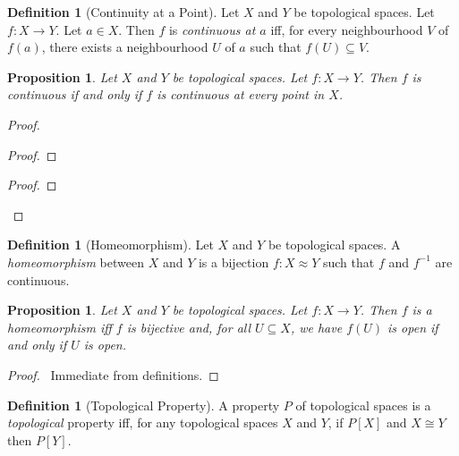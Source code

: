 \documentclass{book}
\let\qed\relax
\newtheorem{prop}[ax]{Proposition}
\theoremstyle{definition}
\newtheorem{df}[ax]{Definition}
\newcommand{\inv}[1]{\ensuremath{{#1}^{-1}}}
\begin{document}
\begin{df}[Continuity at a Point]
Let $X$ and $Y$ be topological spaces. Let $f : X \rightarrow Y$. Let $a \in X$. Then $f$ is \emph{continuous at $a$} iff, for every neighbourhood $V$ of $f(a)$, there exists a neighbourhood $U$ of $a$ such that $f(U) \subseteq V$.
\end{df}

\begin{prop}
Let $X$ and $Y$ be topological spaces. Let $f : X \rightarrow Y$. Then $f$ is continuous if and only if $f$ is continuous at every point in $X$.
\end{prop}

\begin{proof}
\begin{proof}
	\step{d}{\pflet{$U = \inv{f}(V)$}}
\end{proof}
\begin{proof}
	\step{c}{\pflet{$x \in \inv{f}(V)$}}
	\step{f}{$x \in U \subseteq \inv{f}(V)$}
\end{proof}
\qed
\end{proof}

\begin{df}[Homeomorphism]
Let $X$ and $Y$ be topological spaces. A \emph{homeomorphism} between $X$ and $Y$ is a bijection $f : X \approx Y$ such that $f$ and $\inv{f}$ are continuous.
\end{df}

\begin{prop}
Let $X$ and $Y$ be topological spaces. Let $f : X \rightarrow Y$. Then $f$ is a homeomorphism iff $f$ is bijective and, for all $U \subseteq X$, we have $f(U)$ is open if and only if $U$ is open.
\end{prop}

\begin{proof}
\pf\ Immediate from definitions. \qed
\end{proof}

\begin{df}[Topological Property]
A property $P$ of topological spaces is a \emph{topological} property iff, for any topological spaces $X$ and $Y$, if $P[X]$ and $X \cong Y$ then $P[Y]$.
\end{df}
\end{document}
